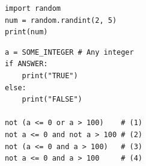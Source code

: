 \documentclass[dvipsnames, svgnames, x11names, handout]{beamer}
\begin{document}
\begin{frame}[fragile]{}
    \begin{center}
        \begin{verbatim}
            import random
            num = random.randint(2, 5)
            print(num)
        \end{verbatim}
    \end{center}
\end{frame}

\begin{frame}[fragile]{}
    \begin{center}
        \begin{verbatim}
            a = SOME_INTEGER # Any integer
            if ANSWER:
                print("TRUE")
            else:
                print("FALSE")
            
            not (a <= 0 or a > 100)    # (1)
            not a <= 0 and not a > 100 # (2)
            not (a <= 0 and a > 100)   # (3)
            not a <= 0 and a > 100     # (4)
        \end{verbatim}
    \end{center}
\end{frame}
\end{document}
